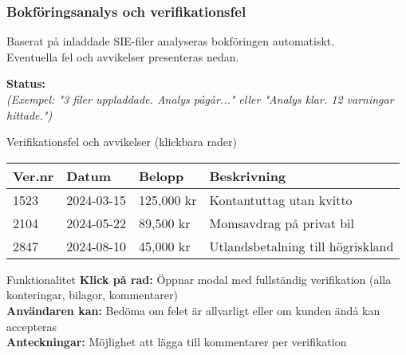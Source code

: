 \documentclass[10pt]{beamer}
\begin{document}
\begin{frame}[label=bokanalys]
  \frametitle{Bokföringsanalys och verifikationsfel}
  \small
  Baserat på inladdade SIE-filer analyseras bokföringen automatiskt.\\
  Eventuella fel och avvikelser presenteras nedan.
  
  \vspace{0.5cm}
  \textbf{Status:} \underline{\hspace{8cm}} \\
  \textit{(Exempel: "3 filer uppladdade. Analys pågår..." eller "Analys klar. 12 varningar hittade.")}
  
  \vspace{0.5cm}
  \begin{block}{Verifikationsfel och avvikelser (klickbara rader)}
    \footnotesize
    \begin{tabular}{|l|l|l|p{4cm}|}
      \hline
      \textbf{Ver.nr} & \textbf{Datum} & \textbf{Belopp} & \textbf{Beskrivning} \\
      \hline
      1523 & 2024-03-15 & 125,000 kr & Kontantuttag utan kvitto \\
      \hline
      2104 & 2024-05-22 & 89,500 kr & Momsavdrag på privat bil \\
      \hline
      2847 & 2024-08-10 & 45,000 kr & Utlandsbetalning till högriskland \\
      \hline
    \end{tabular}
  \end{block}
  
  \vspace{0.3cm}
  \begin{block}{Funktionalitet}
    \footnotesize
    \textbf{Klick på rad:} Öppnar modal med fullständig verifikation (alla konteringar, bilagor, kommentarer)\\
    \textbf{Användaren kan:} Bedöma om felet är allvarligt eller om kunden ändå kan accepteras\\
    \textbf{Anteckningar:} Möjlighet att lägga till kommentarer per verifikation
  \end{block}
  
  \vspace{0.5cm}
  \begin{flushright}
    \hyperlink{nextslide}{}
  \end{flushright}
\end{frame}
\end{document}
